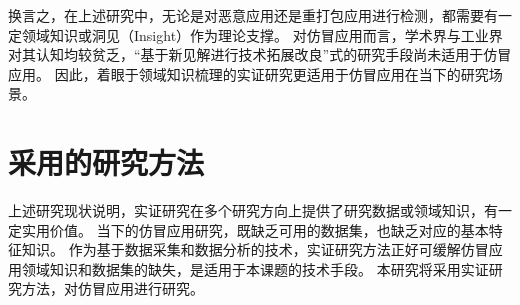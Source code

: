 换言之，在上述研究中，无论是对恶意应用还是重打包应用进行检测，都需要有一定领域知识或洞见（Insight）作为理论支撑。
对仿冒应用而言，学术界与工业界对其认知均较贫乏，``基于新见解进行技术拓展改良''式的研究手段尚未适用于仿冒应用。
因此，着眼于领域知识梳理的实证研究更适用于仿冒应用在当下的研究场景。
%
%
%

\section{采用的研究方法}
上述研究现状说明，实证研究在多个研究方向上提供了研究数据或领域知识，有一定实用价值。
当下的仿冒应用研究，既缺乏可用的数据集，也缺乏对应的基本特征知识。
作为基于数据采集和数据分析的技术，实证研究方法正好可缓解仿冒应用领域知识和数据集的缺失，是适用于本课题的技术手段。
本研究将采用实证研究方法，对仿冒应用进行研究。


